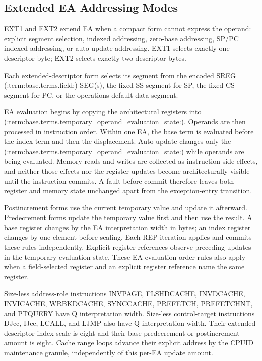 \subsection{Extended EA Addressing Modes}\label{section:extended-ea-addressing}
EXT1 and EXT2 extend EA when a compact form cannot express the operand: explicit segment selection, indexed addressing,
zero-base addressing, SP/PC indexed addressing, or auto-update addressing. EXT1 selects exactly one descriptor byte;
EXT2 selects exactly two descriptor bytes.

Each extended-descriptor form selects its segment from the encoded SREG (:term:base.terms.field:) SEG(s), the fixed SS segment for SP, the fixed CS
segment for PC, or the operation\textquotesingle{}s default data segment.

EA evaluation begins by copying the architectural registers into (:term:base.terms.temporary_operand_evaluation_state:). Operands are
then processed in instruction order. Within one EA, the base term is evaluated before the index term and then the
displacement. Auto-update changes only the (:term:base.terms.temporary_operand_evaluation_state:) while operands are being evaluated. Memory reads and
writes are collected as instruction side effects, and neither those effects nor the register updates become
architecturally visible until the instruction commits. A fault before commit therefore leaves both register and
memory state unchanged apart from the exception-entry transition.

Postincrement forms use the current temporary value and update it afterward. Predecrement forms update the temporary
value first and then use the result. A base register changes by the EA interpretation width in bytes; an index
register changes by one element before scaling. Each REP iteration applies and commits these rules independently.
Explicit register references observe preceding updates in the temporary evaluation state. These EA evaluation-order
rules also apply when a field-selected register and an explicit register reference name the same register.

Size-less address-role instructions INVPAGE, FLSHDCACHE, INVDCACHE, INVICACHE, WRBKDCACHE, SYNCCACHE, PREFETCH,
PREFETCHNT, and PTQUERY have Q interpretation width. Size-less control-target instructions DJcc, IJcc,
LCALL, and LJMP also have Q interpretation width. Their extended-descriptor index scale is eight and their base predecrement or
postincrement amount is eight. Cache range loops advance their explicit address by the CPUID maintenance granule,
independently of this per-EA update amount.

